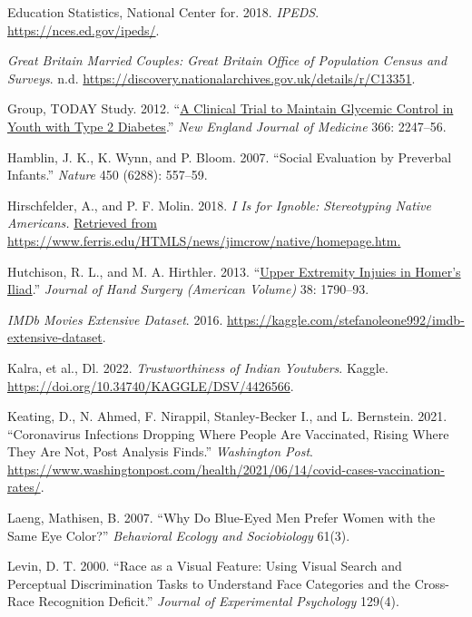 \documentclass[
]{report}
\newlength{\cslhangindent}
\newenvironment{CSLReferences}[2] %
 {\begin{list}{}{%
  \setlength{\itemindent}{0pt}
  \setlength{\leftmargin}{0pt}
  \setlength{\parsep}{0pt}
  \ifodd #1
   \setlength{\leftmargin}{\cslhangindent}
   \setlength{\itemindent}{-1\cslhangindent}
  \fi
  \setlength{\itemsep}{#2\baselineskip}}}
 {\end{list}}
\begin{document}
\begin{CSLReferences}{1}{1}
Education Statistics, National Center for. 2018. \emph{IPEDS}. \url{https://nces.ed.gov/ipeds/}.

\emph{Great Britain Married Couples: Great Britain Office of Population Census and Surveys}. n.d. \url{https://discovery.nationalarchives.gov.uk/details/r/C13351}.

Group, TODAY Study. 2012. {``\href{https://www.ncbi.nlm.nih.gov/pubmed/22540912}{A Clinical Trial to Maintain Glycemic Control in Youth with Type 2 Diabetes}.''} \emph{New England Journal of Medicine} 366: 2247--56.

Hamblin, J. K., K. Wynn, and P. Bloom. 2007. {``Social Evaluation by Preverbal Infants.''} \emph{Nature} 450 (6288): 557--59.

Hirschfelder, A., and P. F. Molin. 2018. \emph{I Is for Ignoble: Stereotyping Native Americans.} \href{Retrieved\%20from\%20https://www.ferris.edu/HTMLS/news/jimcrow/native/homepage.htm.}{Retrieved from https://www.ferris.edu/HTMLS/news/jimcrow/native/homepage.htm.}

Hutchison, R. L., and M. A. Hirthler. 2013. {``\href{https://www.ncbi.nlm.nih.gov/pubmed/23932117}{Upper Extremity Injuies in Homer's Iliad}.''} \emph{Journal of Hand Surgery (American Volume)} 38: 1790--93.

\emph{{IMDb} Movies Extensive Dataset}. 2016. \url{https://kaggle.com/stefanoleone992/imdb-extensive-dataset}.

{Kalra, et al., Dl.} 2022. \emph{Trustworthiness of Indian Youtubers}. Kaggle. \url{https://doi.org/10.34740/KAGGLE/DSV/4426566}.

Keating, D., N. Ahmed, F. Nirappil, Stanley-Becker I., and L. Bernstein. 2021. {``Coronavirus Infections Dropping Where People Are Vaccinated, Rising Where They Are Not, Post Analysis Finds.''} \emph{Washington Post}. \url{https://www.washingtonpost.com/health/2021/06/14/covid-cases-vaccination-rates/}.

Laeng, Mathisen, B. 2007. {``Why Do Blue-Eyed Men Prefer Women with the Same Eye Color?''} \emph{Behavioral Ecology and Sociobiology} 61(3).

Levin, D. T. 2000. {``Race as a Visual Feature: Using Visual Search and Perceptual Discrimination Tasks to Understand Face Categories and the Cross-Race Recognition Deficit.''} \emph{Journal of Experimental Psychology} 129(4).


\end{CSLReferences}
\end{document}

